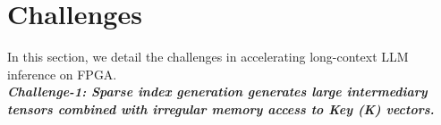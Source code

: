 \documentclass[conference]{IEEEtran}
\begin{document}

\section{Challenges}
\label{Sec:challenges}

In this section, we detail the challenges in accelerating long-context LLM inference on FPGA.\\
\textbf{\textit{Challenge-1: Sparse index generation generates large intermediary tensors combined with irregular memory access to Key (K) vectors.}}

\end{document}
